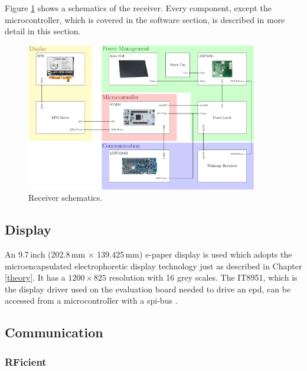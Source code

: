 Figure \ref{hardware:block} shows a schematics of the receiver.
Every component, except the microcontroller, which is covered in the software section, is described in more detail in this section.

\begin{figure}[ht]
	\centering
	\includegraphics[width=0.9\textwidth]{4-development/hardware/graphics/top/top_schematics.pdf}
	\caption{Receiver schematics.\label{hardware:block}}
\end{figure}

\subsection{Display}
An 9.7\,inch (202.8\,mm $\times$ 139.425\,mm) e-paper display is used which adopts the microencapsulated electrophoretic display technology just as described in Chapter \ref{theory}.
It has a $1200\times 825$ resolution with 16 grey scales.
The IT8951, which is the display driver used on the evaluation board needed to drive an \acs{epd}, can be accessed from a microcontroller with a \acs{spi}-bus \cite{waveshare}. 

\subsection{Communication}

\subsubsection{RFicient}

